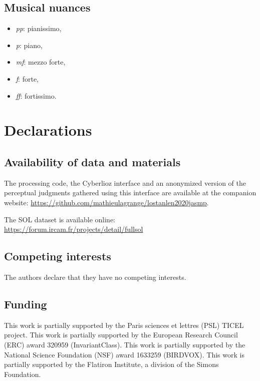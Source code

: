 \documentclass{bmcart}
\newcommand{\nmu}{}
\begin{document}
\begin{backmatter}
\subsection*{Musical nuances}

\begin{itemize}
  \item \emph{pp}: pianissimo,
  \item \emph{p}: piano,
  \item \emph{mf}: mezzo forte,
  \item \emph{f}: forte,
  \item \emph{ff}: fortissimo.
\end{itemize}


\section*{Declarations}

\subsection*{\nmu Availability of data and materials}

The processing code, the Cyberlioz interface and an anonymized version of the  perceptual judgments gathered using this interface are available at the companion website: \url{https://github.com/mathieulagrange/lostanlen2020jasmp}.

The SOL dataset is available online: \url{https://forum.ircam.fr/projects/detail/fullsol}

\subsection*{\nmu Competing interests}
  The authors declare that they have no competing interests.


\subsection*{\nmu Funding}
This work is partially supported by the Paris sciences et lettres (PSL) TICEL project.
This work is partially supported by the European Research Council (ERC) award 320959 (InvariantClass).
This work is partially supported by the National Science Foundation (NSF) award 1633259 (BIRDVOX).
This work is partially supported by the Flatiron Institute, a division of the Simons Foundation.


\end{backmatter}
\end{document}
